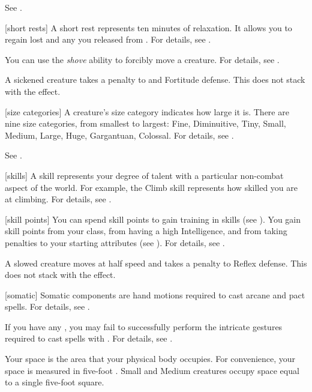  See .

[short rests] A short rest represents ten minutes of relaxation.
It allows you to regain lost  and any  you released from .
For details, see .

 You can use the \textit{shove} ability to forcibly move a creature.
For details, see .

 A sickened creature takes a  penalty to  and Fortitude defense.
This does not stack with the  effect.

[size categories] A creature's size category indicates how large it is.
There are nine size categories, from smallest to largest: Fine, Diminuitive, Tiny, Small, Medium, Large, Huge, Gargantuan, Colossal.
For details, see .

 See .

[skills] A skill represents your degree of talent with a particular non-combat aspect of the world.
For example, the Climb skill represents how skilled you are at climbing.
For details, see .

[skill points] You can spend skill points to gain training in skills (see ).
You gain skill points from your class, from having a high Intelligence, and from taking penalties to your starting attributes (see ).
For details, see .

 A slowed creature moves at half speed and takes a  penalty to Reflex defense.
This does not stack with the  effect.

[somatic] Somatic components are hand motions required to cast arcane and pact spells.
For details, see .

 If you have any , you may fail to successfully perform the intricate gestures required to cast spells with .
For details, see .

 Your space is the area that your physical body occupies.
For convenience, your space is measured in five-foot .
Small and Medium creatures occupy space equal to a single five-foot square.

